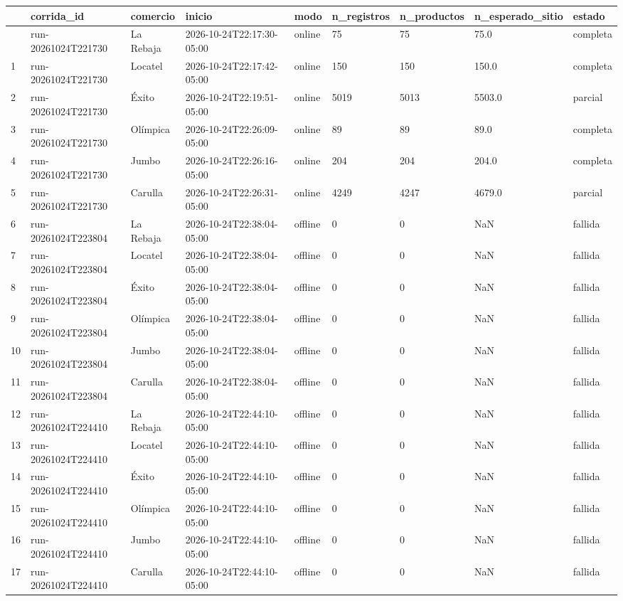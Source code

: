 \documentclass[
  spanish,
  letterpaper,
  DIV=11,
  numbers=noendperiod]{scrartcl}
\newcounter{none} %
\begin{document}
{\def\LTcaptype{none} %
\begin{longtable}[]{@{}lllllllll@{}}
\toprule\noalign{}
& corrida\_id & comercio & inicio & modo & n\_registros & n\_productos &
n\_esperado\_sitio & estado \\
\midrule\noalign{}
\endhead
\bottomrule\noalign{}
\endlastfoot
0 & run-20261024T221730 & La Rebaja & 2026-10-24T22:17:30-05:00 & online
& 75 & 75 & 75.0 & completa \\
1 & run-20261024T221730 & Locatel & 2026-10-24T22:17:42-05:00 & online &
150 & 150 & 150.0 & completa \\
2 & run-20261024T221730 & Éxito & 2026-10-24T22:19:51-05:00 & online &
5019 & 5013 & 5503.0 & parcial \\
3 & run-20261024T221730 & Olímpica & 2026-10-24T22:26:09-05:00 & online
& 89 & 89 & 89.0 & completa \\
4 & run-20261024T221730 & Jumbo & 2026-10-24T22:26:16-05:00 & online &
204 & 204 & 204.0 & completa \\
5 & run-20261024T221730 & Carulla & 2026-10-24T22:26:31-05:00 & online &
4249 & 4247 & 4679.0 & parcial \\
6 & run-20261024T223804 & La Rebaja & 2026-10-24T22:38:04-05:00 &
offline & 0 & 0 & NaN & fallida \\
7 & run-20261024T223804 & Locatel & 2026-10-24T22:38:04-05:00 & offline
& 0 & 0 & NaN & fallida \\
8 & run-20261024T223804 & Éxito & 2026-10-24T22:38:04-05:00 & offline &
0 & 0 & NaN & fallida \\
9 & run-20261024T223804 & Olímpica & 2026-10-24T22:38:04-05:00 & offline
& 0 & 0 & NaN & fallida \\
10 & run-20261024T223804 & Jumbo & 2026-10-24T22:38:04-05:00 & offline &
0 & 0 & NaN & fallida \\
11 & run-20261024T223804 & Carulla & 2026-10-24T22:38:04-05:00 & offline
& 0 & 0 & NaN & fallida \\
12 & run-20261024T224410 & La Rebaja & 2026-10-24T22:44:10-05:00 &
offline & 0 & 0 & NaN & fallida \\
13 & run-20261024T224410 & Locatel & 2026-10-24T22:44:10-05:00 & offline
& 0 & 0 & NaN & fallida \\
14 & run-20261024T224410 & Éxito & 2026-10-24T22:44:10-05:00 & offline &
0 & 0 & NaN & fallida \\
15 & run-20261024T224410 & Olímpica & 2026-10-24T22:44:10-05:00 &
offline & 0 & 0 & NaN & fallida \\
16 & run-20261024T224410 & Jumbo & 2026-10-24T22:44:10-05:00 & offline &
0 & 0 & NaN & fallida \\
17 & run-20261024T224410 & Carulla & 2026-10-24T22:44:10-05:00 & offline
& 0 & 0 & NaN & fallida \\
\end{longtable}
}
\end{document}

